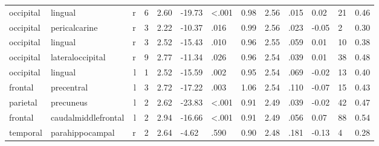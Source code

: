 \documentclass{article}
\begin{document}
\begin{longtable}{llrR{1.3cm}R{1cm}R{1.3cm}R{1cm}R{1cm}R{1.3cm}R{1cm}R{1.8cm}R{1.3cm}R{1.8cm}}
 occipital &                   lingual &    r &         6 &                  2.60 &           -19.73 &      \textless.001 &                               0.98 &                          2.56 &                            .015 &   0.02 &     21 &      0.46 \\
 occipital &             pericalcarine &    r &         3 &                  2.22 &           -10.37 &               .016 &                               0.99 &                          2.56 &                            .023 &  -0.05 &      2 &      0.30 \\
 occipital &                   lingual &    r &         3 &                  2.52 &           -15.43 &               .010 &                               0.96 &                          2.55 &                            .059 &   0.01 &     10 &      0.38 \\
 occipital &          lateraloccipital &    r &         9 &                  2.77 &           -11.34 &               .026 &                               0.96 &                          2.54 &                            .039 &   0.01 &     38 &      0.48 \\
 occipital &                   lingual &    l &         1 &                  2.52 &           -15.59 &               .002 &                               0.95 &                          2.54 &                            .069 &  -0.02 &     13 &      0.40 \\
   frontal &                precentral &    l &         3 &                  2.72 &           -17.22 &               .003 &                               1.06 &                          2.54 &                            .110 &  -0.07 &     15 &      0.43 \\
  parietal &                 precuneus &    l &         2 &                  2.62 &           -23.83 &      \textless.001 &                               0.91 &                          2.49 &                            .039 &  -0.02 &     42 &      0.47 \\
   frontal &       caudalmiddlefrontal &    l &         2 &                  2.94 &           -16.66 &      \textless.001 &                               0.91 &                          2.49 &                            .056 &   0.07 &     88 &      0.54 \\
  temporal &           parahippocampal &    r &         2 &                  2.64 &            -4.62 &               .590 &                               0.90 &                          2.48 &                            .181 &  -0.13 &      4 &      0.28 \\

\end{longtable}
\end{document}
